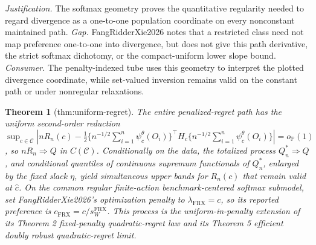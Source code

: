 \documentclass{article}
\newtheorem{theorem}{Theorem}
\begin{document}
\par\smallskip\noindent \textit{Justification.} The softmax geometry proves the quantitative regularity needed to regard divergence as a one-to-one population coordinate on every nonconstant maintained path. \textit{Gap.} FangRidderXie2026 notes that a restricted class need not map preference one-to-one into divergence, but does not give this path derivative, the strict softmax dichotomy, or the compact-uniform lower slope bound. \textit{Consumer.} The penalty-indexed tube uses this geometry to interpret the plotted divergence coordinate, while set-valued inversion remains valid on the constant path or under nonregular relaxations.

\begin{theorem}[thm:uniform-regret]\label{thm:uniform-regret}
The entire penalized-regret path has the uniform second-order reduction \(\sup_{c\in\mathcal C}|nR_n(c)-\tfrac12\{n^{-1/2}\sum_{i=1}^n\psi^\theta_c(O_i)\}^\top H_c\{n^{-1/2}\sum_{i=1}^n\psi^\theta_c(O_i)\}|=o_{\mathbb P}(1)\), so \(nR_n\Rightarrow Q\) in \(C(\mathcal C)\). Conditionally on the data, the totalized process \(Q_n^*\Rightarrow Q\), and conditional quantiles of continuous supremum functionals of \(Q_n^*\), enlarged by the fixed slack \(\eta\), yield simultaneous upper bands for \(R_n(c)\) that remain valid at \(\widehat c\). On the common regular finite-action benchmark-centered softmax submodel, set FangRidderXie2026's optimization penalty to \(\lambda_{\mathrm{FRX}}=c\), so its reported preference is \(c_{\mathrm{FRX}}=c/s_W^{\mathrm{FRX}}\). This process is the uniform-in-penalty extension of its Theorem 2 fixed-penalty quadratic-regret law and its Theorem 5 efficient doubly robust quadratic-regret limit.
\end{theorem}
\end{document}
